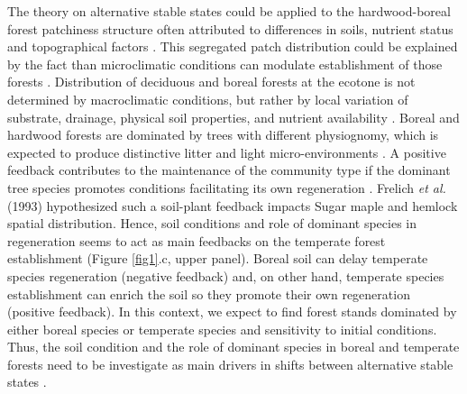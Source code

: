 The theory on alternative stable
states could be applied to the hardwood-boreal forest patchiness structure
often attributed to differences in soils, nutrient status and topographical
factors \cite{Society2014}. 
This segregated patch distribution could be
explained by the fact than microclimatic conditions can modulate establishment
of those forests \cite{DeFrenne2013}. Distribution of deciduous and boreal
forests at the ecotone is not determined by macroclimatic conditions, but
rather by local variation of substrate, drainage, physical soil properties,
and nutrient availability \cite{Goldblum2010,Society2014}. 
Boreal and hardwood
forests are dominated by trees with different physiognomy, which is expected
to produce distinctive litter and light micro-environments \cite{Barras1998}.
A positive feedback contributes to the maintenance of the community type if the
dominant tree species promotes conditions facilitating its own regeneration
\cite{Barras1998}. Frelich \textit{et al.}(1993) \cite{Society2014}
hypothesized such a soil-plant feedback impacts Sugar maple and hemlock spatial distribution. Hence, soil
conditions and role of dominant species in regeneration seems to act as main
feedbacks on the temperate forest establishment (Figure \ref{fig1}.c, upper
panel). Boreal soil can delay temperate species regeneration (negative
feedback) and, on other hand, temperate species establishment can enrich the
soil so they promote their own regeneration (positive feedback).
In this context, we expect to find forest stands dominated by either boreal
species or temperate species and sensitivity to initial conditions. Thus, the soil condition and the role of
dominant species in boreal and temperate forests need to be investigate as main
drivers in shifts between alternative stable states
\cite{Kellman2004,Moore2008,DeFrenne2013,Barras1998}.


